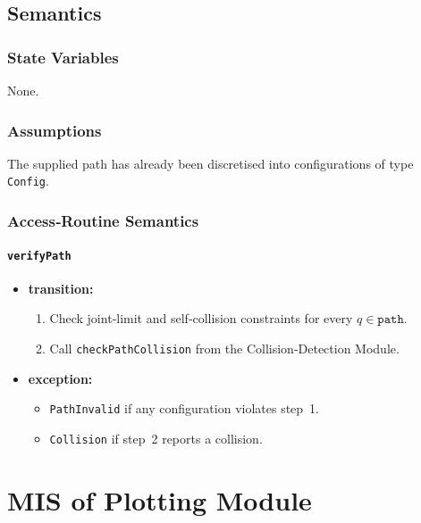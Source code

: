 \documentclass[12pt, titlepage]{article}
\begin{document}
\subsection{Semantics}
\subsubsection{State Variables}
None.

\subsubsection{Assumptions}
The supplied path has already been discretised into configurations of type \texttt{Config}.

\subsubsection{Access‑Routine Semantics}

\paragraph{\texttt{verifyPath}}
\begin{itemize}
  \item \textbf{transition:}
        \begin{enumerate}
          \item Check joint‑limit and self‑collision constraints for every $q\in\texttt{path}$.
          \item Call \texttt{checkPathCollision} from the Collision‑Detection Module.
        \end{enumerate}
  \item \textbf{exception:}
        \begin{itemize}
          \item \texttt{PathInvalid} if any configuration violates step 1.
          \item \texttt{Collision} if step 2 reports a collision.
        \end{itemize}
\end{itemize}


\newpage
\section{MIS of Plotting Module}
\label{mod:plot}
\end{document}
